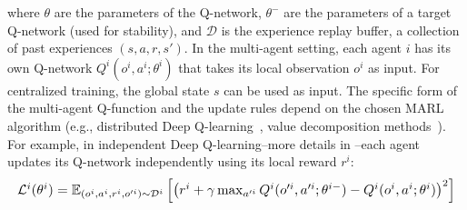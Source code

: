 \documentclass[sigconf]{acmart}
\begin{document}
where $\theta$ are the parameters of the Q-network, $\theta^-$ are the parameters of a target Q-network (used for stability), 
and $\mathcal{D}$ is the experience replay buffer, a collection of past experiences $(s, a, r, s')$.
%
In the multi-agent setting, each agent $i$ has its own Q-network $Q^i(o^i, a^i; \theta^i)$ that takes its local observation $o^i$ as input.  
For centralized training, the global state $s$ can be used as input. 
The specific form of the multi-agent Q-function and the update rules depend on the chosen MARL algorithm (e.g., distributed Deep Q-learning~\cite{ong2015distributed}, value decomposition methods~\cite{DBLP:conf/icml/SonKKHY19}).  
For example, in independent Deep Q-learning--more details in --each agent updates its Q-network independently using its local reward $r^i$:
\begin{equation}
  \resizebox{\linewidth}{!}{$
  \mathcal{L}^i(\theta^i) = \mathbb{E}_{(o^i, a^i, r^i, o'^i) \sim \mathcal{D}^i} \left[ \left( r^i + \gamma \max_{a'^i} Q^i(o'^i, a'^i; \theta^{i-}) - Q^i(o^i, a^i; \theta^i) \right)^2 \right]
  $}
  \end{equation}
\end{document}
